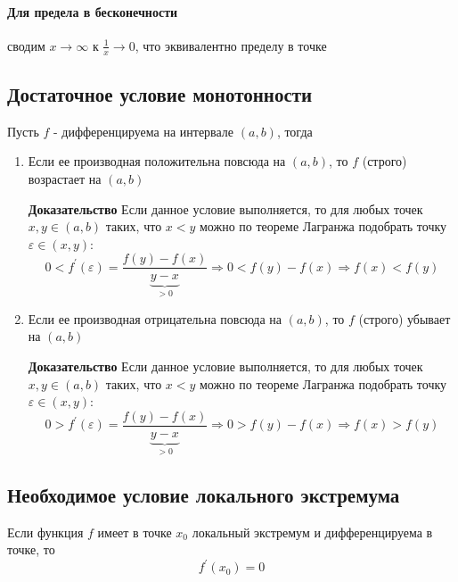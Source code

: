 \documentclass[class=article,a4paper,12pt,crop=false]{standalone}
\begin{document}
\paragraph{Для предела в бесконечности} сводим $x \rightarrow \infty$ к $\frac{1}{x} \rightarrow 0$,
что эквивалентно пределу в точке

\subsection{Достаточное условие монотонности}

Пусть $f$ - дифференцируема на интервале $(a, b)$, тогда
\begin{enumerate}
    \item {
        Если ее производная положительна повсюда на $(a, b)$, то $f$ (строго) возрастает на $(a, b)$
    
        \textbf{Доказательство} Если данное условие выполняется, то для любых точек $x,y \in (a, b)$ таких,
        что $x < y$ можно по теореме Лагранжа подобрать точку $\varepsilon \in (x, y)$:
        \begin{equation}
            0 < f^{'}(\varepsilon) = \frac{f(y) - f(x)}{\underset{> 0}{\underbrace{y - x}}} \Rightarrow
            0 < f(y) - f(x) \Rightarrow f(x) < f(y)
        \end{equation}    
    }
    \item {
        Если ее производная отрицательна повсюда на $(a, b)$, то $f$ (строго) убывает на $(a, b)$
        
        \textbf{Доказательство} Если данное условие выполняется, то для любых точек $x,y \in (a, b)$ таких,
        что $x < y$ можно по теореме Лагранжа подобрать точку $\varepsilon \in (x, y)$:
        \begin{equation}
            0 > f^{'}(\varepsilon) = \frac{f(y) - f(x)}{\underset{> 0}{\underbrace{y - x}}} \Rightarrow
            0 > f(y) - f(x) \Rightarrow f(x) > f(y)
        \end{equation}    
    }
\end{enumerate}

\subsection{Необходимое условие локального экстремума}

Если функция $f$ имеет в точке $x_0$ локальный экстремум и дифференцируема в точке, то
\begin{equation}
    f^{'}(x_0) = 0
\end{equation}
\end{document}
